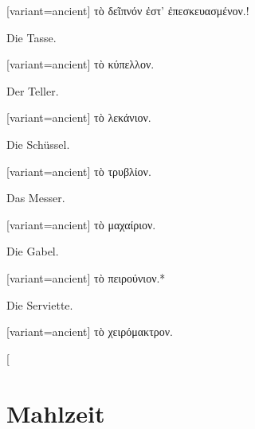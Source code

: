 \switchcolumn

\begin{greek}[variant=ancient]%
τὸ δεῖπνόν ἐστ' ἐπεσκευασμένον.!

\end{greek}%
\switchcolumn*

Die Tasse.

\switchcolumn

\begin{greek}[variant=ancient]%
τὸ κύπελλον.

\end{greek}%
\switchcolumn*

Der Teller.

\switchcolumn

\begin{greek}[variant=ancient]%
τὸ λεκάνιον.

\end{greek}%
\switchcolumn*

Die Schüssel.

\switchcolumn

\begin{greek}[variant=ancient]%
τὸ τρυβλίον.

\end{greek}%
\switchcolumn*

Das Messer.

\switchcolumn

\begin{greek}[variant=ancient]%
τὸ μαχαίριον.

\end{greek}%
\switchcolumn*

Die Gabel.

\switchcolumn

\begin{greek}[variant=ancient]%
τὸ πειρούνιον.{*}

\end{greek}%
\switchcolumn*

Die Serviette.

\switchcolumn

\begin{greek}[variant=ancient]%
τὸ χειρόμακτρον.

\end{greek}%
\switchcolumn*[


\section{Mahlzeit}

